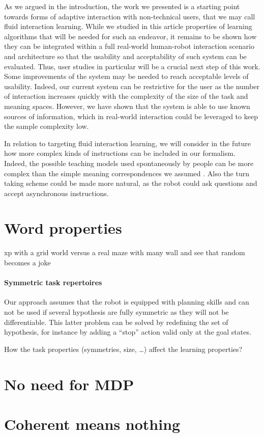 As we argued in the introduction, the work we presented is a starting point towards forms of adaptive interaction with non-technical users, that we may call fluid interaction learning. While we studied in this article properties of learning algorithms that will be needed for such an endeavor, it remains to be shown how they can be integrated within a full real-world human-robot interaction scenario and architecture so that the usability and acceptability of such system can be evaluated. Thus, user studies in particular will be a crucial next step of this work. Some improvements of the system may be needed to reach acceptable levels of usability.
Indeed, our current system can be restrictive for the user as the number of interaction increases quickly with the complexity of the size of the task and meaning spaces. However, we have shown that the system is able to use known sources of information, which in real-world interaction could be leveraged to keep the sample complexity low.

In relation to targeting fluid interaction learning, we will consider in the future how more complex kinds of instructions can be included in our formalism. Indeed, the possible teaching models used spontaneously by people can be more complex than the simple meaning correspondences we assumed \cite{thomaz2008teachable,Cakmak2010optimality}. Also the turn taking scheme could be made more natural, as the robot could ask questions \cite{cakmak2012designing} and accept asynchronous instructions.

\section{Word properties}
xp with a grid world versus a real maze with many wall and see that random becomes a joke

\paragraph{Symmetric task repertoires} Our approach assumes that the robot is equipped with planning skills and can not be used if several hypothesis are fully symmetric as they will not be differentiable. This latter problem can be solved by redefining the set of hypothesis, for instance by adding a ``stop'' action valid only at the goal states.

How the task properties (symmetries, size, \ldots) affect the learning properties?

\section{No need for MDP}


\section{Coherent means nothing}


